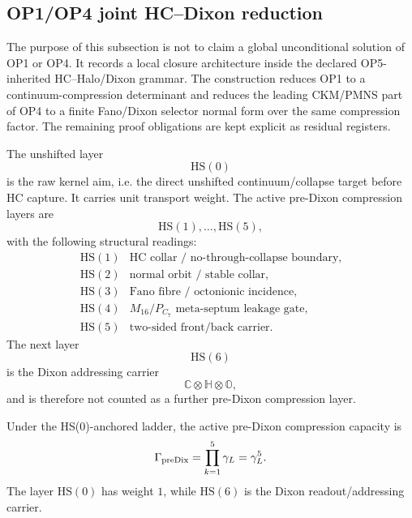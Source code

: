 
\subsection{OP1/OP4 joint HC--Dixon reduction}
\label{ssec:op1-op4-joint-hcdixon-reduction}

\begin{remark}
\label{rem:op1-op4-reduction-scope}
The purpose of this subsection is not to claim a global unconditional
solution of OP1 or OP4.  It records a local closure architecture inside
the declared OP5-inherited HC--Halo/Dixon grammar.  The construction
reduces OP1 to a continuum-compression determinant and reduces the
leading CKM/PMNS part of OP4 to a finite Fano/Dixon selector normal form
over the same compression factor.  The remaining proof obligations are
kept explicit as residual registers.
\end{remark}

\begin{definition}
\label{def:hs0-anchored-ladder}
The unshifted layer
\[
  \mathrm{HS}(0)
\]
is the raw kernel aim, i.e. the direct unshifted continuum/collapse
target before HC capture.  It carries unit transport weight.  The active
pre-Dixon compression layers are
\[
  \mathrm{HS}(1),\ldots,\mathrm{HS}(5),
\]
with the following structural readings:
\[
\begin{array}{c|l}
\mathrm{HS}(1) & \text{HC collar / no-through-collapse boundary},\\
\mathrm{HS}(2) & \text{normal orbit / stable collar},\\
\mathrm{HS}(3) & \text{Fano fibre / octonionic incidence},\\
\mathrm{HS}(4) & M_{16}/P_{C_7}\text{ meta-septum leakage gate},\\
\mathrm{HS}(5) & \text{two-sided front/back carrier}.
\end{array}
\]
The next layer
\[
  \mathrm{HS}(6)
\]
is the Dixon addressing carrier
\[
  \mathbb C\otimes\mathbb H\otimes\mathbb O,
\]
and is therefore not counted as a further pre-Dixon compression layer.
\end{definition}

\begin{lemma}
\label{lem:hs0-predixon-capacity}
Under the HS(0)-anchored ladder, the active pre-Dixon compression
capacity is
\[
  \Gamma_{\mathrm{preDix}}
  =
  \prod_{k=1}^{5}\gamma_L
  =
  \gamma_L^5.
\]
The layer \(\mathrm{HS}(0)\) has weight \(1\), while \(\mathrm{HS}(6)\)
is the Dixon readout/addressing carrier.
\end{lemma}

